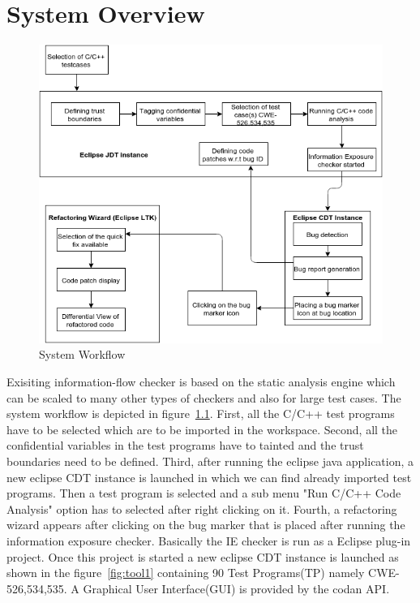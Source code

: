 \let\cleardoublepage\clearpage
\chapter{System Overview}
\begin{figure}[!htb]
\centering
\includegraphics[width=1.0\textwidth]{png/system.png}
\caption{System Workflow}
\label{fig:system}
\end{figure}
Exisiting information-flow checker is based on the static analysis engine
which can be scaled to many other types of checkers and also for large 
test cases. The system workflow is depicted in figure~\ref{fig:system}.
First, all the C/C++ test programs have to be selected which are to be imported
in the workspace. Second, all the confidential variables in the test
programs have to tainted and the trust boundaries need to be defined.
Third, after running the eclipse java application, a new eclipse CDT instance
is launched in which we can find already imported test programs. Then a test
program is selected and a sub menu "Run C/C++ Code Analysis" option
has to selected after right clicking on it. Fourth, a refactoring wizard
appears after clicking on the bug marker that is placed after running the
information exposure checker. Basically the IE checker is run as a Eclipse
plug-in project. Once this project is started a new eclipse CDT instance is 
launched as shown in the figure~\ref{fig:tool1} containing 90 Test Programs(TP)
namely CWE-526,534,535. A Graphical User Interface(GUI) is provided by the codan API.

